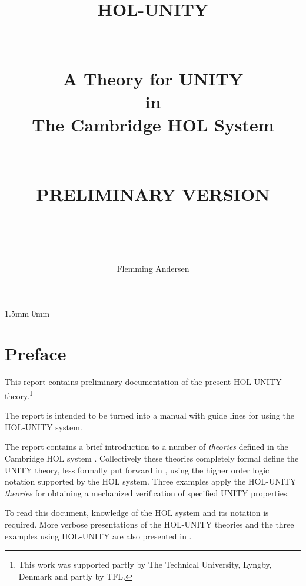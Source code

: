 

\title{  {\Huge HOL-UNITY}\\ \ \\ \ \\
           {\Large A Theory for UNITY\\
                           in\\
                   The Cambridge HOL System\\ \ \\ \ \\}
           {\large PRELIMINARY VERSION}\\ \ \\ \ \\
      }

\author{Flemming Andersen}

\setlength {\parskip} {1.5mm}
\setlength {\parindent} {0mm}




\maketitle    
{}
\tableofcontents
\newpage
{}

\cleardoublepage
\chapter*{Preface}



This report contains preliminary documentation of the present HOL-UNITY
theory.\footnote{This work was supported partly by The Technical University,
Lyngby, Denmark and partly by TFL.}  

The report is intended to be turned into a manual with guide lines for using
the HOL-UNITY system.


\bigskip
The report contains a brief introduction to a number of {\it theories} defined
in the Cambridge HOL system \cite{Gordon87,HOLMAN}.  Collectively these
theories completely formal define the UNITY theory, less formally put forward
in \cite{CM88}, using the higher order logic notation supported by the HOL
system.  Three examples apply the HOL-UNITY {\it theories} for obtaining a 
mechanized verification of specified UNITY properties.

\bigskip
To read this document, knowledge of the HOL system and its notation is
required.  More verbose presentations of the HOL-UNITY theories and the three
examples using HOL-UNITY are also presented in \cite{FA92}.


